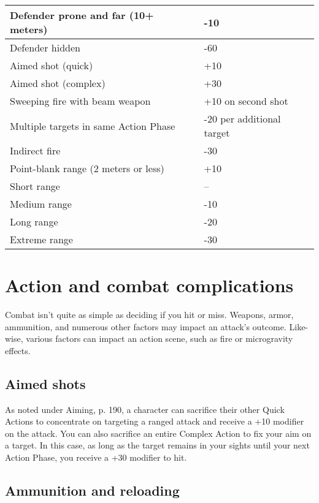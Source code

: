 \begin{table}
\begin{tabular}{|l|l|}
\hline Defender prone and far (10+ meters) 	& -10 \\
\hline Defender hidden 					& -60 \\
\hline Aimed shot (quick) 					& +10 \\
\hline Aimed shot (complex) 				& +30 \\
\hline Sweeping fire with beam weapon 		& +10 on second shot \\
\hline Multiple targets in same Action Phase 	& -20 per additional target \\
\hline Indirect fire 						& -30 \\
\hline Point-blank range (2 meters or less) 	& +10 \\
\hline Short range 						& -- \\
\hline Medium range 						& -10 \\
\hline Long range 						& -20 \\
\hline Extreme range 						& -30 \\
\hline
\end{tabular}
\label{table:combat-modifiers}
\end{table}


\section{Action and combat complications}
\label{sec:action-combat-comp}

Combat isn’t quite as simple as deciding if you hit or miss. Weapons, armor, ammunition, and numerous other factors may impact an attack’s outcome. Like- wise, various factors can impact an action scene, such as fire or microgravity effects.


\subsection{Aimed shots}
\label{sec:aimed-shots}

As noted under Aiming, p. 190, a character can sacrifice their other Quick Actions to concentrate on targeting a ranged attack and receive a +10 modifier on the attack. You can also sacrifice an entire Complex Action to fix your aim on a target. In this case, as long as the target remains in your sights until your next Action Phase, you receive a +30 modifier to hit.


\subsection{Ammunition and reloading}
\label{sec:ammunition-reloading}


